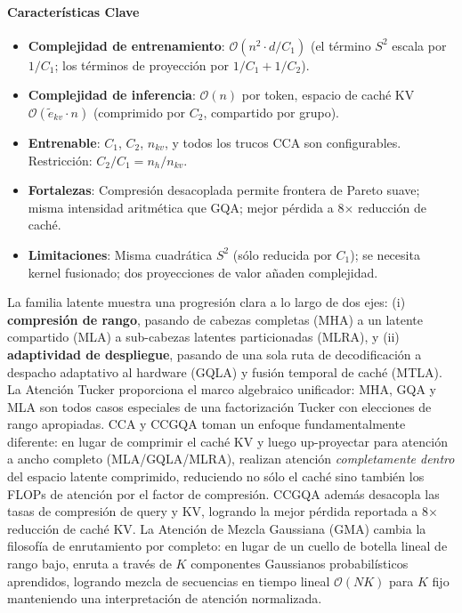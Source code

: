 \paragraph{Características Clave}
\begin{itemize}[leftmargin=*]
    \item \textbf{Complejidad de entrenamiento}: $\mathcal{O}(n^2 \cdot d / C_1)$ (el término $S^2$ escala por $1/C_1$; los términos de proyección por $1/C_1 + 1/C_2$).
    \item \textbf{Complejidad de inferencia}: $\mathcal{O}(n)$ por token, espacio de caché KV $\mathcal{O}(\tilde{e}_{kv} \cdot n)$ (comprimido por $C_2$, compartido por grupo).
    \item \textbf{Entrenable}: $C_1$, $C_2$, $n_{kv}$, y todos los trucos CCA son configurables. Restricción: $C_2/C_1 = n_h/n_{kv}$.
    \item \textbf{Fortalezas}: Compresión desacoplada permite frontera de Pareto suave; misma intensidad aritmética que GQA; mejor pérdida a 8$\times$ reducción de caché.
    \item \textbf{Limitaciones}: Misma cuadrática $S^2$ (sólo reducida por $C_1$); se necesita kernel fusionado; dos proyecciones de valor añaden complejidad.
\end{itemize}

La familia latente muestra una progresión clara a lo largo de dos ejes: (i) \textbf{compresión de rango}, pasando de cabezas completas (MHA) a un latente compartido (MLA) a sub-cabezas latentes particionadas (MLRA), y (ii) \textbf{adaptividad de despliegue}, pasando de una sola ruta de decodificación a despacho adaptativo al hardware (GQLA) y fusión temporal de caché (MTLA). La Atención Tucker proporciona el marco algebraico unificador: MHA, GQA y MLA son todos casos especiales de una factorización Tucker con elecciones de rango apropiadas. CCA y CCGQA toman un enfoque fundamentalmente diferente: en lugar de comprimir el caché KV y luego up-proyectar para atención a ancho completo (MLA/GQLA/MLRA), realizan atención \emph{completamente dentro} del espacio latente comprimido, reduciendo no sólo el caché sino también los FLOPs de atención por el factor de compresión. CCGQA además desacopla las tasas de compresión de query y KV, logrando la mejor pérdida reportada a 8$\times$ reducción de caché KV. La Atención de Mezcla Gaussiana (GMA) cambia la filosofía de enrutamiento por completo: en lugar de un cuello de botella lineal de rango bajo, enruta a través de $K$ componentes Gaussianos probabilísticos aprendidos, logrando mezcla de secuencias en tiempo lineal $\mathcal{O}(NK)$ para $K$ fijo manteniendo una interpretación de atención normalizada.

